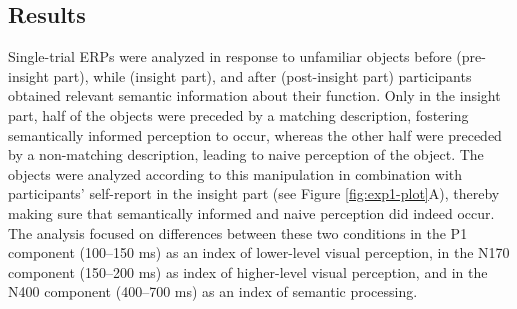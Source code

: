 \documentclass[
  english,
  man,12pt,twoside]{apa7}
\begin{document}
\hypertarget{results}{%
\subsection{Results}\label{results}}

Single-trial ERPs were analyzed in response to unfamiliar objects before (pre-insight part), while (insight part), and after (post-insight part) participants obtained relevant semantic information about their function. Only in the insight part, half of the objects were preceded by a matching description, fostering semantically informed perception to occur, whereas the other half were preceded by a non-matching description, leading to naive perception of the object. The objects were analyzed according to this manipulation in combination with participants' self-report in the insight part (see Figure \ref{fig:exp1-plot}A), thereby making sure that semantically informed and naive perception did indeed occur. The analysis focused on differences between these two conditions in the P1 component (100--150 ms) as an index of lower-level visual perception, in the N170 component (150--200 ms) as index of higher-level visual perception, and in the N400 component (400--700 ms) as an index of semantic processing.
\end{document}
